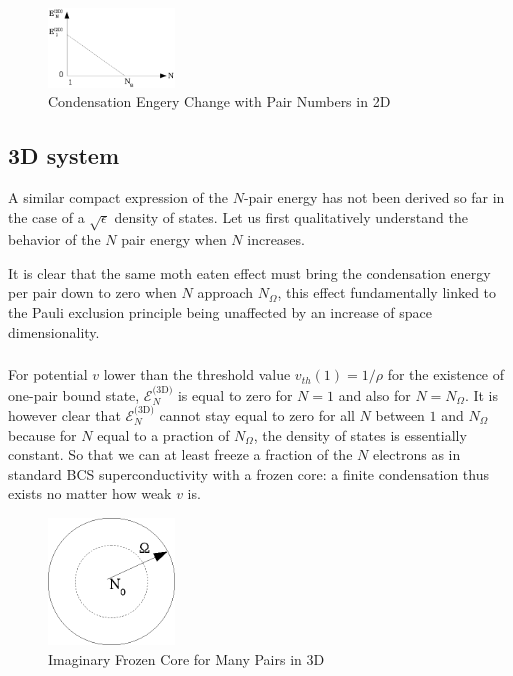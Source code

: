 \documentclass{article}
\newcommand{\sd}{{\ensuremath{{\text{(3D)}}}}}
\begin{document}
\begin{figure}[htbp]
	\centering
		\includegraphics[width=0.30\textwidth]{2dCondEnergy.eps}
	\caption{Condensation Engery Change  with Pair Numbers in 2D}
	\label{fig:2dCondEnergy}
\end{figure}



\subsection{3D system}
A similar compact expression of the $N$-pair energy has not been derived so far in the case of a $\sqrt{\epsilon}$ density of states. Let us first qualitatively understand the behavior of the $N$ pair energy when $N$ increases. 

It is clear that the same moth eaten effect must bring the condensation energy per pair down to zero when $N$ approach $N_\Omega$, this effect fundamentally linked to the Pauli exclusion principle being unaffected by an increase of space dimensionality. 

\subsubsection{}
For potential $v$ lower than the threshold value $v_{th}(1)=1/\rho$ for the existence of one-pair bound state, $\mathcal{E}_N^\sd$ is equal to zero for $N=1$ and also for $N=N_\Omega$.  It is however clear that $\mathcal{E}_N^\sd$ cannot stay equal to zero for all $N$ between $1$ and $N_\Omega$ because for $N$ equal to a praction of $N_\Omega$, the density of states is essentially constant.  So that we can at least freeze a fraction of the $N$ electrons as in standard BCS superconductivity with a frozen core: a finite condensation thus exists no matter how weak $v$ is. 

\begin{figure}[htbp]
	\centering
		\includegraphics[width=0.30\textwidth]{potential.eps}
	\caption{Imaginary Frozen Core for Many Pairs in 3D}
	\label{fig:potential}
\end{figure}
\end{document}
